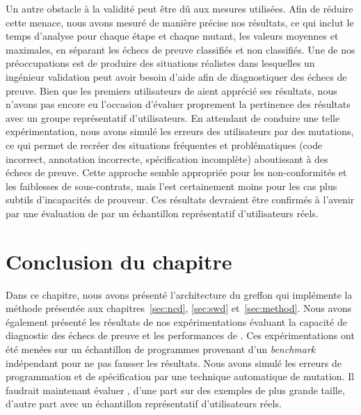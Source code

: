 Un autre obstacle à la validité peut être dû aux mesures utilisées.
Afin de réduire cette menace, nous avons mesuré de manière précise nos
résultats, ce qui inclut le temps d'analyse pour chaque étape et chaque mutant,
les valeurs moyennes et maximales, en séparant les échecs de preuve classifiés
et non classifiés.
Une de nos préoccupations est de produire des situations réalistes dans
lesquelles un ingénieur validation peut avoir besoin d'aide afin de
diagnostiquer des échecs de preuve.
Bien que les premiers utilisateurs de \stady aient apprécié ses résultats, nous
n'avons pas encore eu l'occasion d'évaluer proprement la pertinence des
résultats avec un groupe représentatif d'utilisateurs.
En attendant de conduire une telle expérimentation, nous avons simulé les
erreurs des utilisateurs par des mutations, ce qui permet de recréer des
situations fréquentes et problématiques (code incorrect, annotation incorrecte,
spécification incomplète) aboutissant à des échecs de preuve.
Cette approche semble appropriée pour les non-conformités et les faiblesses de
sous-contrats, mais l'est certainement moins pour les cas plus subtils
d'incapacités de prouveur.
Ces résultats devraient être confirmés à l'avenir par une évaluation de \stady
par un échantillon représentatif d'utilisateurs réels.


\section*{Conclusion du chapitre}


Dans ce chapitre, nous avons présenté l'architecture du greffon \stady qui
implémente la méthode présentée aux chapitres~\ref{sec:ncd}, \ref{sec:swd}
et~\ref{sec:method}.
Nous avons également présenté les résultats de nos expérimentations évaluant
la capacité de diagnostic des échecs de preuve et les performances de \stady.
Ces expérimentations ont été menées sur un échantillon de programmes provenant
d'un {\em benchmark} indépendant pour ne pas fausser les résultats.
Nous avons simulé les erreurs de programmation et de spécification par une
technique automatique de mutation.
Il faudrait maintenant évaluer \stady, d'une part sur des exemples de plus
grande taille, d'autre part avec un échantillon représentatif d'utilisateurs
réels.
